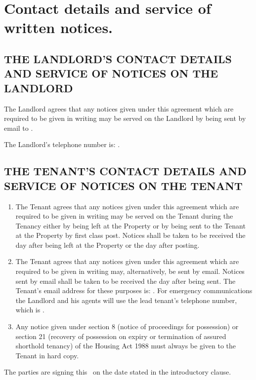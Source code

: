 \section{Contact details and service of written notices.}

\subsection{THE LANDLORD'S CONTACT DETAILS AND SERVICE OF NOTICES ON THE LANDLORD}

{The Landlord agrees that any notices given under this agreement which are required to be given in writing may be served on the Landlord by being sent by email to \LLEmail. }

{The Landlord's telephone number is: \LLTelno. } 


\subsection{THE TENANT'S CONTACT DETAILS AND SERVICE OF NOTICES ON THE TENANT}
\begin{enumerate}
\item{The Tenant agrees that any notices given under this agreement which are required to be given in writing may be served on the Tenant during the Tenancy either by being left at the Property or by being sent to the Tenant at the Property by first class post. Notices shall be taken to be received the day after being left at the Property or the day after posting.}

\item{The Tenant agrees that any notices given under this agreement which are required to be given in writing may, alternatively, be sent by email. Notices sent by email shall be taken to be received the day after being sent. The Tenant's email address for these purposes is: \TenEmail. } For emergency communications the Landlord and his agents will use the lead tenant's telephone number, which is \TenTelno.

\item{Any notice given under section 8 (notice of proceedings for possession) or section 21 (recovery of possession on expiry or termination of assured shorthold tenancy) of the Housing Act 1988 must always be given to the Tenant in hard copy.}
\end{enumerate}

The parties are signing this \TitleText\ on the date stated in the introductory clause.

\vspace{2cm}

\SignatureBlock

 

